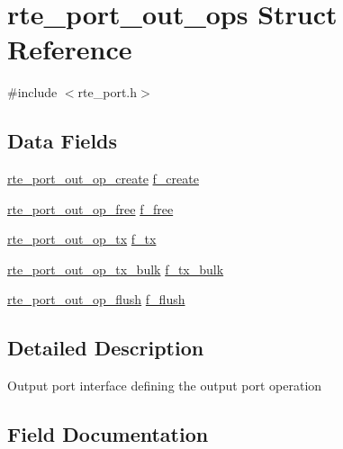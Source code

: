 \hypertarget{structrte__port__out__ops}{}\section{rte\+\_\+port\+\_\+out\+\_\+ops Struct Reference}
\label{structrte__port__out__ops}


{\ttfamily \#include $<$rte\+\_\+port.\+h$>$}

\subsection*{Data Fields}
\begin{DoxyCompactItemize}
\item 
\hyperlink{rte__port_8h_ac2325b5913b9297988160266923ac01f}{rte\+\_\+port\+\_\+out\+\_\+op\+\_\+create} \hyperlink{structrte__port__out__ops_aafa10f331808a5965b730809de936857}{f\+\_\+create}
\item 
\hyperlink{rte__port_8h_a261cc1510c49cd9d596a0935c785bff1}{rte\+\_\+port\+\_\+out\+\_\+op\+\_\+free} \hyperlink{structrte__port__out__ops_accfd44d1258a63793352fcd325cc2115}{f\+\_\+free}
\item 
\hyperlink{rte__port_8h_a01964e0cb9d8b9cdf57e65e953bfa9b8}{rte\+\_\+port\+\_\+out\+\_\+op\+\_\+tx} \hyperlink{structrte__port__out__ops_a86a7c9cc97ac095acafb087b8d4f5fcb}{f\+\_\+tx}
\item 
\hyperlink{rte__port_8h_a7170a9d42ba676e13db5fcd231dca173}{rte\+\_\+port\+\_\+out\+\_\+op\+\_\+tx\+\_\+bulk} \hyperlink{structrte__port__out__ops_aec9106ca02ac43cf62b23ab8d49461a7}{f\+\_\+tx\+\_\+bulk}
\item 
\hyperlink{rte__port_8h_a646459275b4b4d5a039d089414799eb0}{rte\+\_\+port\+\_\+out\+\_\+op\+\_\+flush} \hyperlink{structrte__port__out__ops_ac90ad3e84388d556a1ea7ebefd255d8a}{f\+\_\+flush}
\end{DoxyCompactItemize}


\subsection{Detailed Description}
Output port interface defining the output port operation 

\subsection{Field Documentation}
\hypertarget{structrte__port__out__ops_aafa10f331808a5965b730809de936857}{}
